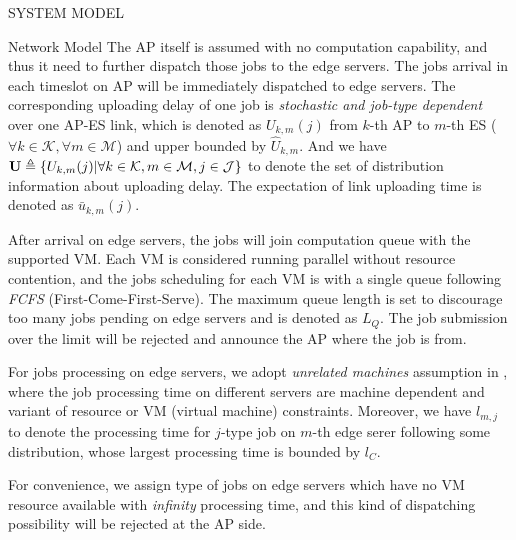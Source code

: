 \documentclass[10pt, conference, letterpaper]{IEEEtran}
\newcommand{\define}{\triangleq}
\renewcommand{\vec}{\mathbf}
\DeclarePairedDelimiter{\set}{\{}{\}}
\newcommand{\apSet}{\mathcal{K}}
\newcommand{\esSet}{\mathcal{M}}
\newcommand{\jSpace}{\mathcal{J}}
\begin{document}
\begin{section}{SYSTEM MODEL}
\begin{subsection}{Network Model}
            The AP itself is assumed with no computation capability, and thus it need to further dispatch those jobs to the edge servers.
            The jobs arrival in each timeslot on AP will be immediately dispatched to edge servers.
            {\color{red}The corresponding uploading delay of one job is \emph{stochastic and job-type dependent} over one AP-ES link, which is denoted as $U_{k,m}(j)$ from $k$-th AP to $m$-th ES ($\forall k\in\apSet, \forall m\in\esSet$) and upper bounded by $\hat{U}_{k,m}$.
            And we have $\vec{U} \define \set{U_{k,m}(j)|\forall k\in\apSet,m\in\esSet,j\in\jSpace}$ to denote the set of distribution information about uploading delay. The expectation of link uploading time is denoted as $\bar{u}_{k,m}(j)$.}

            After arrival on edge servers, the jobs will join computation queue with the supported VM.
            Each VM is considered running parallel without resource contention, and the jobs scheduling for each VM is with a single queue following \emph{FCFS} (First-Come-First-Serve).
            {\color{red}The maximum queue length is set to discourage too many jobs pending on edge servers and is denoted as $L_Q$. The job submission over the limit will be rejected and announce the AP where the job is from.}

            {\color{red}For jobs processing on edge servers, we adopt \emph{unrelated machines} assumption in \cite{tan-online}, where the job processing time on different servers are machine dependent and variant of resource or VM (virtual machine) constraints.
            Moreover, we have $l_{m,j}$ to denote the processing time for $j$-type job on $m$-th edge serer following some distribution, whose largest processing time is bounded by $l_C$.}

            For convenience, we assign type of jobs on edge servers which have no VM resource available with \emph{infinity} processing time, and this kind of dispatching possibility will be rejected at the AP side.
        \end{subsection}


\end{section}
\end{document}
